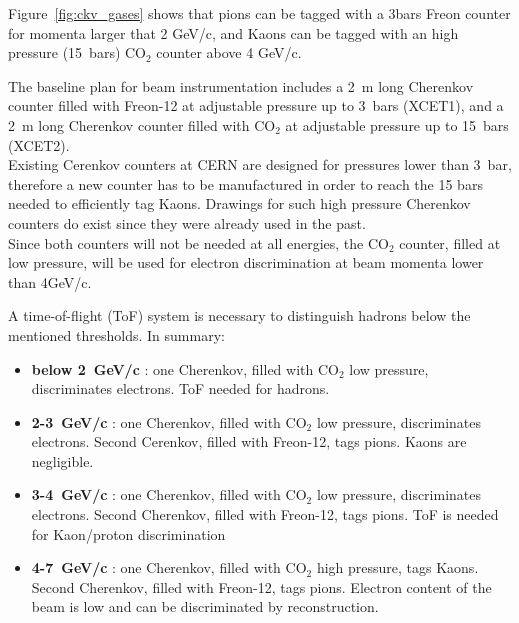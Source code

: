  Figure~\ref{fig:ckv_gases} shows that pions can be tagged with a 3bars Freon counter for momenta larger that 2 GeV/c, and Kaons can be tagged with an high pressure  (15~bars) CO$_2$  counter above 4 GeV/c.

The baseline plan for beam instrumentation includes a 2~m long
Cherenkov  counter filled with Freon-12 at adjustable pressure up to
3~bars (XCET1), and a  2~m long  
 Cherenkov  counter filled with CO$_2$ at adjustable pressure up to
 15~bars (XCET2).\\
Existing Cerenkov counters at CERN are designed for pressures lower than  3~bar, therefore a new counter has to be manufactured in order to reach the 15 bars needed to efficiently tag Kaons. Drawings for such high pressure Cherenkov counters do exist since they were already used in the past. \\
%
Since both  counters will not be needed at all energies, the CO$_2$
counter, filled at low pressure,  will be used for electron discrimination at beam momenta lower
than 4GeV/c.  

A time-of-flight (ToF) system  is  necessary   to distinguish hadrons below the mentioned thresholds.
%
In summary:
\begin{itemize}
\item {\bf below 2~GeV/c} : one Cherenkov, filled with CO$_2$ low
  pressure, discriminates electrons. ToF needed for hadrons.
\item {\bf 2-3~GeV/c} : one Cherenkov, filled with CO$_2$ low
  pressure, discriminates electrons. Second Cerenkov, filled with
  Freon-12, tags pions. Kaons are negligible.
\item {\bf 3-4~GeV/c} : one Cherenkov, filled with CO$_2$ low
  pressure, discriminates electrons. Second  Cherenkov, filled with
  Freon-12, tags pions. ToF is needed for Kaon/proton discrimination
\item {\bf 4-7~GeV/c} : one Cherenkov, filled with CO$_2$ high
  pressure, tags Kaons. Second  Cherenkov, filled with
  Freon-12, tags pions. Electron content of the beam is low and can be
  discriminated by reconstruction.
\end{itemize}



